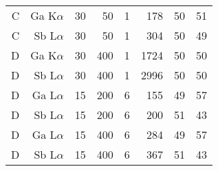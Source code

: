 \begin{table}[phtb]
\begin{center}
\begin{tabular}{rrrrrrrr}
            C               & Ga K$\alpha$       & 30             & 50             & 1           & 178               & 50                   & 51                        \\
            C               & Sb L$\alpha$       & 30             & 50             & 1           & 304               & 50                   & 49                        \\
            \hline
            D               & Ga K$\alpha$       & 30             & 400            & 1           & 1724              & 50                   & 50                        \\
            D               & Sb L$\alpha$       & 30             & 400            & 1           & 2996              & 50                   & 50                        \\
            D               & Ga L$\alpha$       & 15             & 200            & 6           & 155               & 49                   & 57                        \\
            D               & Sb L$\alpha$       & 15             & 200            & 6           & 200               & 51                   & 43                        \\
            D               & Ga L$\alpha$       & 15             & 400            & 6           & 284               & 49                   & 57                        \\
            D               & Sb L$\alpha$       & 15             & 400            & 6           & 367               & 51                   & 43                        \\
            \hline
        \end{tabular}
    \end{center}
\end{table}



